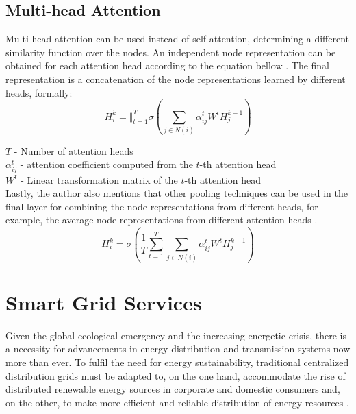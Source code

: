 \subsection*{Multi-head Attention}

Multi-head attention can be used instead of self-attention, determining a different similarity function over the nodes. An independent node representation can be obtained for each attention head according to the equation bellow \cite{velickovicGraphAttentionNetworks2018, tangGraphNeuralNetworks2022}. The final representation is a concatenation of the node representations learned by different heads, formally:
$$ H^k_i = \Big\Vert^T_{t=1} \sigma(\sum_{j \in N(i)} \alpha^t_{ij} W^t H^{k-1}_j)$$

$T$ - Number of attention heads \\
$\alpha^t_{ij}$ - attention coefficient computed from the $t$-th attention head \\
$W^t$ - Linear transformation matrix of the $t$-th attention head \\

Lastly, the author also mentions that other pooling techniques can be used in the final layer for combining the node representations from different heads, for example, the average node representations from different attention heads \cite{velickovicGraphAttentionNetworks2018, tangGraphNeuralNetworks2022}.
\begin{equation}
	H^k_i = \sigma(\frac{1}{T} \sum^T_{t = 1} \sum_{j \in N(i)} \alpha^t_{ij} W^t H^{k-1}_j)
\end{equation}


\section{Smart Grid Services} \label{sec:smart-grid-services}

Given the global ecological emergency and the increasing energetic crisis, there is a necessity for advancements in energy distribution and transmission systems now more than ever. To fulfil the need for energy sustainability, traditional centralized distribution grids must be adapted to, on the one hand, accommodate the rise of distributed renewable energy sources in corporate and domestic consumers and, on the other, to make more efficient and reliable distribution of energy resources \cite{farhangiPathSmartGrid2010, vijayapriyaSmartGridOverview2011}. \par


